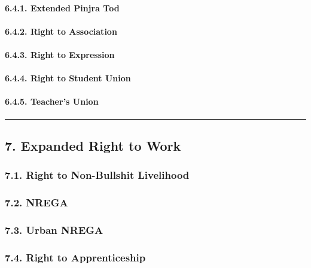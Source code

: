 \paragraph{6.4.1. Extended Pinjra Tod}\label{extended-pinjra-tod-1}

\paragraph{6.4.2. Right to Association}\label{right-to-association}

\paragraph{6.4.3. Right to Expression}\label{right-to-expression}

\paragraph{6.4.4. Right to Student Union}\label{right-to-student-union}

\paragraph{6.4.5. Teacher's Union}\label{teachers-union}

\begin{center}\rule{0.5\linewidth}{0.5pt}\end{center}

\subsection{7. Expanded Right to Work}\label{expanded-right-to-work}

\subsubsection{7.1. Right to Non-Bullshit
Livelihood}\label{right-to-non-bullshit-livelihood}

\subsubsection{7.2. NREGA}\label{nrega}

\subsubsection{7.3. Urban NREGA}\label{urban-nrega}

\subsubsection{7.4. Right to
Apprenticeship}\label{right-to-apprenticeship}


